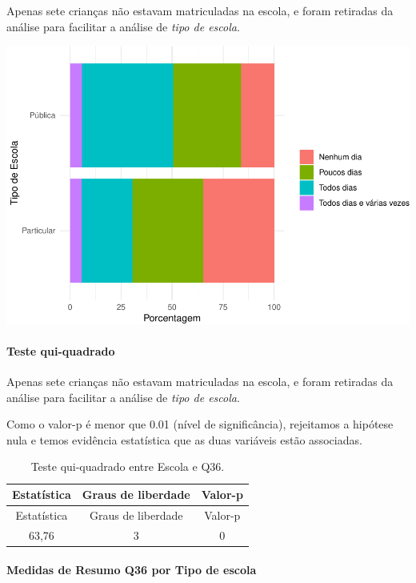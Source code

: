 \documentclass[]{article}
\let\oldparagraph\paragraph
\renewcommand{\paragraph}[1]{\oldparagraph{#1}\mbox{}}
\begin{document}
Apenas sete crianças não estavam matriculadas na escola, e foram retiradas da análise para facilitar a análise de \emph{tipo de escola}.

\begin{center}\includegraphics[width=0.75\linewidth]{relatorio_covid19_files/figure-latex/unnamed-chunk-1351-1} \end{center}

\hypertarget{teste-qui-quadrado-116}{%
\paragraph{Teste qui-quadrado}\label{teste-qui-quadrado-116}}

Apenas sete crianças não estavam matriculadas na escola, e foram retiradas da análise para facilitar a análise de \emph{tipo de escola}.

Como o valor-p é menor que 0.01 (nível de significância), rejeitamos a hipótese nula e temos evidência estatística que as duas variáveis estão associadas.

\begin{longtable}[]{@{}ccc@{}}
\caption{\label{tab:unnamed-chunk-1353}Teste qui-quadrado entre Escola e Q36.}\tabularnewline
\toprule
Estatística & Graus de liberdade & Valor-p\tabularnewline
\midrule
\endfirsthead
\toprule
Estatística & Graus de liberdade & Valor-p\tabularnewline
\midrule
\endhead
63,76 & 3 & 0\tabularnewline
\bottomrule
\end{longtable}

\cleardoublepage

\hypertarget{medidas-de-resumo-q36-por-tipo-de-escola}{%
\paragraph{Medidas de Resumo Q36 por Tipo de escola}\label{medidas-de-resumo-q36-por-tipo-de-escola}}
\end{document}
